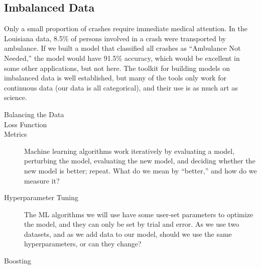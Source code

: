 \subsection{Imbalanced Data}

Only a small proportion of crashes require immediate medical attention.  In the Louisiana data, 8.5\% of persons involved in a crash were transported by ambulance.  If we built a model that classified all crashes as ``Ambulance Not Needed,'' the model would have 91.5\% accuracy, which would be excellent in some other applications, but not here.  The toolkit for building models on imbalanced data is well established, but many of the tools only work for continuous data (our data is all categorical), and their use is as much art as science. 
	 
\begin{description}

	\item [Balancing the Data]
	
	\item [Loss Function]
	
	
	\item [Metrics]  Machine learning algorithms work iteratively by evaluating a model, perturbing the model, evaluating the new model, and deciding whether the new model is better; repeat.  What do we mean by ``better,'' and how do we measure it?  
	
	\item [Hyperparameter Tuning]  The ML algorithms we will use have some user-set parameters to optimize the model, and they can only be set by trial and error.  As we use two datasets, and as we add data to our model, should we use the same hyperparameters, or can they change?   

	\item [Boosting]
\end{description}

